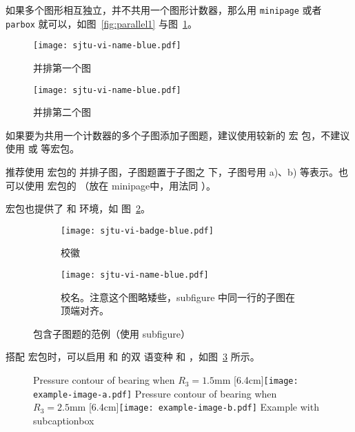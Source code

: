 如果多个图形相互独立，并不共用一个图形计数器，那么用 \texttt{minipage} 或者
\texttt{parbox} 就可以，如图~\ref{fig:parallel1} 与图~\ref{fig:parallel2}。

\begin{figure}[!htp]
  \centering
  \begin{minipage}{0.48\textwidth}
    \centering
    \texttt{[image: sjtu-vi-name-blue.pdf]}
    \caption{并排第一个图}
    \label{fig:parallel1}
  \end{minipage}\hfill
  \begin{minipage}{0.48\textwidth}
    \centering
    \texttt{[image: sjtu-vi-name-blue.pdf]}
    \caption{并排第二个图}
    \label{fig:parallel2}
  \end{minipage}
\end{figure}

如果要为共用一个计数器的多个子图添加子图题，建议使用较新的 宏
包，不建议使用  或  等宏包。

推荐使用  宏包的  并排子图，子图题置于子图之
下，子图号用 a)、b) 等表示。也可以使用  宏包的 
（放在 minipage中，用法同 ）。

 宏包也提供了  和  环境，如
图~\ref{fig:subfigure}。

\begin{figure}[!htp]
  \centering
  \begin{subfigure}{0.3\textwidth}
    \centering
    \texttt{[image: sjtu-vi-badge-blue.pdf]}
    \caption{校徽}
  \end{subfigure}
  \hspace{1cm}
  \begin{subfigure}{0.4\textwidth}
    \centering
    \texttt{[image: sjtu-vi-name-blue.pdf]}
    \caption{校名。注意这个图略矮些，subfigure 中同一行的子图在顶端对齐。}
  \end{subfigure}
  \caption{包含子图题的范例（使用 subfigure）}
  \label{fig:subfigure}
\end{figure}

搭配  宏包时，可以启用  和  的双
语变种  和 ，如图~\ref{fig:bisubcaptionbox}
所示。

\begin{figure}[!hbtp]
  \centering
                  {Pressure contour of bearing when $R_3 = 1.5\text{mm}$}%
                  [6.4cm]{\texttt{[image: example-image-a.pdf]}}
  \hspace{1cm}
                  {Pressure contour of bearing when $R_3 = 2.5\text{mm}$}%
                  [6.4cm]{\texttt{[image: example-image-b.pdf]}}
            {Example with subcaptionbox}
  \label{fig:bisubcaptionbox}
\end{figure}


